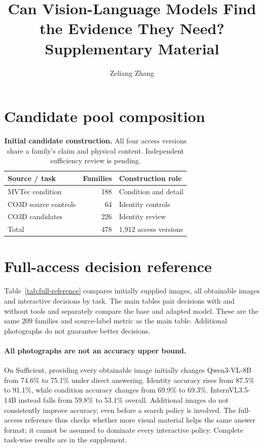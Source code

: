 \documentclass[10pt,twocolumn,letterpaper]{article}
\title{Can Vision-Language Models Find\\the Evidence They Need?\\{\large Supplementary Material}}
\author{Zeliang Zhang}
\begin{document}
\maketitle
\appendix

\section{Candidate pool composition}
\begin{table}[t]
\centering\small
\caption{\textbf{Initial candidate construction.}
All four access versions share a family's claim and physical content.
Independent sufficiency review is pending.}
\label{tab:pool}
\begin{tabularx}{\linewidth}{@{}l r Y@{}}
\toprule
Source / task & Families & Construction role\\
\midrule
MVTec condition & 188 & Condition and detail\\
CO3D source controls & 64 & Identity controls\\
CO3D candidates & 226 & Identity review\\
\midrule
Total & 478 & 1,912 access versions\\
\bottomrule
\end{tabularx}
\end{table}
\section{Full-access decision reference}
Table~\ref{tab:full-reference} compares initially supplied images, all obtainable images and interactive decisions by task.
The main tables pair decisions with and without tools and separately compare the base and adapted model.
These are the same 209 families and source-label metric as the main table.
Additional photographs do not guarantee better decisions.

\paragraph{All photographs are not an accuracy upper bound.}
On Sufficient, providing every obtainable image initially changes Qwen3-VL-8B from 74.6\% to 75.1\% under direct answering.
Identity accuracy rises from 87.5\% to 91.1\%, while condition accuracy changes from 69.9\% to 69.3\%.
InternVL3.5-14B instead falls from 59.8\% to 53.1\% overall.
Additional images do not consistently improve accuracy, even before a search policy is involved.
The full-access reference thus checks whether more visual material helps the same answer format; it cannot be assumed to dominate every interactive policy.
Complete task-wise results are in the supplement.



{\small


}
\end{document}

